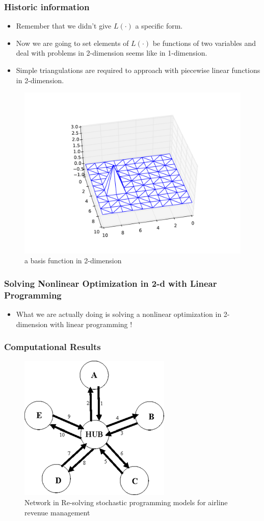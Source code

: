\documentclass{beamer}
\begin{document}
\begin{frame}
\frametitle{Historic information}
\begin{itemize}
\item
Remember that we didn't give $L(\cdot)$ a specific form.
\item
Now we are going to set elements of $L(\cdot)$ be functions of two variables and deal with problems in 2-dimension seems like in 1-dimension.
\item
Simple triangulations are required to approach with piecewise linear functions in 2-dimension.
\end{itemize}
\begin{figure}
\centering
\includegraphics[width=.5\textwidth]{basis_3.pdf}
\caption{a basis function in 2-dimension}
\end{figure}
\end{frame}

\begin{frame}
\frametitle{Solving Nonlinear Optimization in 2-d with Linear Programming}
\begin{itemize}
\item What we are actually doing is solving a nonlinear optimization in 2-dimension with linear programming !
\end{itemize}
\end{frame}

\begin{frame}
\frametitle{Computational Results}
\begin{figure}
\centering
\includegraphics[width=.5\textwidth]{resolve.png}
\caption{Network in Re-solving stochastic programming models for airline
revenue management}
\end{figure}
\end{frame}
\end{document}
